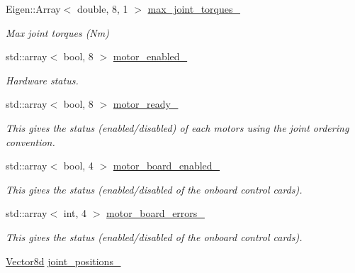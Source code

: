 \begin{DoxyCompactItemize}
Eigen\+::\+Array$<$ double, 8, 1 $>$ \hyperlink{classblmc__robots_1_1Solo8_a053f46bebf56986d976e34c0c47956c9}{max\+\_\+joint\+\_\+torques\+\_\+}
\begin{DoxyCompactList}\small\item\em Max joint torques (Nm) \end{DoxyCompactList}\item 
std\+::array$<$ bool, 8 $>$ \hyperlink{classblmc__robots_1_1Solo8_a8966f925be4af6937b4544cb5dbc8eab}{motor\+\_\+enabled\+\_\+}
\begin{DoxyCompactList}\small\item\em Hardware status. \end{DoxyCompactList}\item 
\mbox{\label{classblmc__robots_1_1Solo8_a01868736d0656e8dd029b69297661b48}} 
std\+::array$<$ bool, 8 $>$ \hyperlink{classblmc__robots_1_1Solo8_a01868736d0656e8dd029b69297661b48}{motor\+\_\+ready\+\_\+}
\begin{DoxyCompactList}\small\item\em This gives the status (enabled/disabled) of each motors using the joint ordering convention. \end{DoxyCompactList}\item 
\mbox{\label{classblmc__robots_1_1Solo8_adfe55489326f302577d3d851e098bbaf}} 
std\+::array$<$ bool, 4 $>$ \hyperlink{classblmc__robots_1_1Solo8_adfe55489326f302577d3d851e098bbaf}{motor\+\_\+board\+\_\+enabled\+\_\+}
\begin{DoxyCompactList}\small\item\em This gives the status (enabled/disabled of the onboard control cards). \end{DoxyCompactList}\item 
\mbox{\label{classblmc__robots_1_1Solo8_af8f47463c79497bfa978ac90249ea144}} 
std\+::array$<$ int, 4 $>$ \hyperlink{classblmc__robots_1_1Solo8_af8f47463c79497bfa978ac90249ea144}{motor\+\_\+board\+\_\+errors\+\_\+}
\begin{DoxyCompactList}\small\item\em This gives the status (enabled/disabled of the onboard control cards). \end{DoxyCompactList}\item 
\hyperlink{common__header_8hpp_a98975ffbe0bca1296078e0350dfedd60}{Vector8d} \hyperlink{classblmc__robots_1_1Solo8_a2a731cc04e539d6fde3c3e5cd6922a42}{joint\+\_\+positions\+\_\+}

\end{DoxyCompactItemize}
